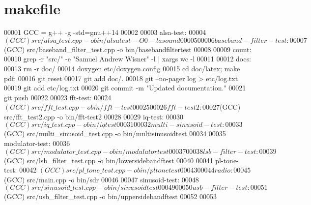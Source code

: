 \hypertarget{makefile_source}{\section{makefile}
}

\begin{DoxyCode}
00001 GCC = g++ -g -std=gnu++14
00002 
00003 alsa-test:
00004    $(GCC) src/alsa\_test.cpp -o bin/alsatest -O0 -lasound
00005 
00006 baseband-filter-test:
00007    $(GCC) src/baseband\_filter\_test.cpp -o bin/basebandfiltertest
00008 
00009 count:
00010    grep -r "src/" -e "Samuel Andrew Wisner" -l | xargs wc -l
00011 
00012 docs:
00013    rm -r doc/
00014    doxygen etc/doxygen.config
00015    cd doc/latex; make pdf;
00016    git reset
00017    git add doc/.
00018    git --no-pager log > etc/log.txt
00019    git add etc/log.txt
00020    git commit -m "Updated documentation."
00021    git push
00022 
00023 fft-test:
00024    $(GCC) src/fft\_test.cpp -o bin/fft-test
00025 
00026 fft-test2:
00027    $(GCC) src/fft\_test2.cpp -o bin/fft-test2
00028 
00029 iq-test:
00030    $(GCC) src/iq\_test.cpp -o bin/iqtest
00031 
00032 multi-sinusoid-test:
00033    $(GCC) src/multi\_sinusoid\_test.cpp -o bin/multisinusoidtest
00034 
00035 modulator-test:
00036    $(GCC) src/modulator\_test.cpp -o bin/modulatortest
00037 
00038 lsb-filter-test:
00039    $(GCC) src/lsb\_filter\_test.cpp -o bin/lowersidebandftest
00040 
00041 pl-tone-test:
00042    $(GCC) src/pl\_tone\_test.cpp -o bin/pltonetest
00043 
00044 radio:
00045    $(GCC) src/main.cpp -o bin/sdr
00046 
00047 sinusoid-test:
00048    $(GCC) src/sinusoid\_test.cpp -o bin/sinusoidtest
00049 
00050 usb-filter-test:
00051    $(GCC) src/usb\_filter\_test.cpp -o bin/uppersidebandftest
00052 
00053 
\end{DoxyCode}
